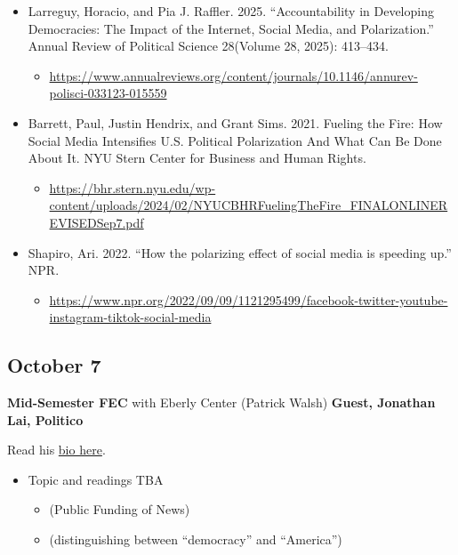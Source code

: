 \documentclass[]{tufte-handout}
\providecommand{\tightlist}{%
  \setlength{\itemsep}{0pt}\setlength{\parskip}{0pt}}
\begin{document}
\begin{itemize}
\tightlist
\item
  Larreguy, Horacio, and Pia J. Raffler. 2025. ``Accountability in
  Developing Democracies: The Impact of the Internet, Social Media, and
  Polarization.'' Annual Review of Political Science 28(Volume 28,
  2025): 413--434.

  \begin{itemize}
  \tightlist
  \item
    \url{https://www.annualreviews.org/content/journals/10.1146/annurev-polisci-033123-015559}
  \end{itemize}
\item
  Barrett, Paul, Justin Hendrix, and Grant Sims. 2021. Fueling the Fire:
  How Social Media Intensifies U.S. Political Polarization And What Can
  Be Done About It. NYU Stern Center for Business and Human Rights.

  \begin{itemize}
  \tightlist
  \item
    \url{https://bhr.stern.nyu.edu/wp-content/uploads/2024/02/NYUCBHRFuelingTheFire_FINALONLINEREVISEDSep7.pdf}
  \end{itemize}
\item
  Shapiro, Ari. 2022. ``How the polarizing effect of social media is
  speeding up.'' NPR.

  \begin{itemize}
  \tightlist
  \item
    \url{https://www.npr.org/2022/09/09/1121295499/facebook-twitter-youtube-instagram-tiktok-social-media}
  \end{itemize}
\end{itemize}

\hypertarget{october-7}{%
\subsection{October 7}\label{october-7}}

\textbf{Mid-Semester FEC } with Eberly Center (Patrick Walsh)
\textbf{Guest, Jonathan Lai, Politico}

Read his \href{https://www.politico.com/staff/jonathan-lai}{bio here}.

\begin{itemize}
\tightlist
\item
  Topic and readings TBA

  \begin{itemize}
  \tightlist
  \item
    (Public Funding of News)
  \item
    (distinguishing between ``democracy'' and ``America'')
  \end{itemize}
\end{itemize}
\end{document}

